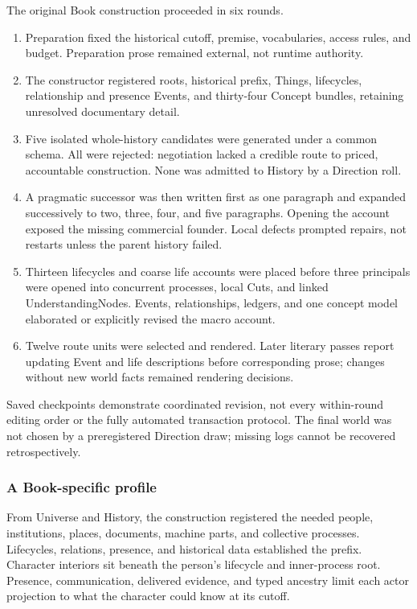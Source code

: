 \documentclass[11pt,a4paper]{article}
\begin{document}
The original Book construction proceeded in six rounds.

\begin{enumerate}
  \item Preparation fixed the historical cutoff, premise, vocabularies, access
    rules, and budget. Preparation prose remained external, not runtime authority.
  \item The constructor registered roots, historical prefix, Things,
    lifecycles, relationship and presence Events, and thirty-four Concept
    bundles, retaining unresolved documentary detail.
  \item Five isolated whole-history candidates were generated under a common
    schema. All were rejected: negotiation lacked a credible route to priced,
    accountable construction. None was admitted to History by a Direction roll.
  \item A pragmatic successor was then written first as one paragraph and
    expanded successively to two, three, four, and five paragraphs. Opening the
    account exposed the missing commercial founder. Local defects prompted
    repairs, not restarts unless the parent history failed.
  \item Thirteen lifecycles and coarse life accounts were placed before three
    principals were opened into concurrent processes, local Cuts, and linked
    UnderstandingNodes. Events, relationships, ledgers, and one concept model
    elaborated or explicitly revised the macro account.
  \item Twelve route units were selected and rendered. Later literary passes
    report updating Event and life descriptions before corresponding prose;
    changes without new world facts remained rendering decisions.
\end{enumerate}

Saved checkpoints demonstrate coordinated revision, not every within-round
editing order or the fully automated transaction protocol. The final world was
not chosen by a preregistered Direction draw; missing logs cannot be recovered
retrospectively.

\subsubsection{A Book-specific profile}

From Universe and History, the construction registered the needed people,
institutions, places, documents, machine parts, and collective processes.
Lifecycles, relations, presence, and historical data established the prefix.
Character interiors sit beneath the person's lifecycle and inner-process root. Presence, communication, delivered
evidence, and typed ancestry limit each actor projection to what the character
could know at its cutoff.
\end{document}
